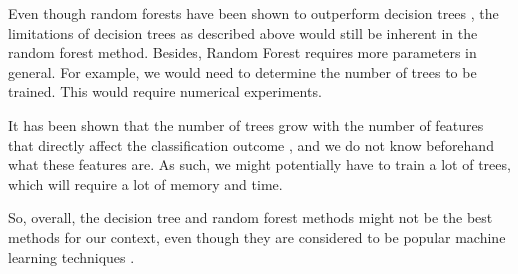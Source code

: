 \documentclass[12pt, twoside, a4paper]{report}
\begin{document}
Even though random forests have been shown to outperform decision trees \cite{RefWorks:103}, the limitations of decision trees as described above would still be inherent in the random forest method. Besides, Random Forest requires more parameters in general. For example, we would need to determine the number of trees to be trained. This would require numerical experiments.

It has been shown that the number of trees grow with the number of features that directly affect the classification outcome \cite{RefWorks:102}, and we do not know beforehand what these features are. As such, we might potentially have to train a lot of trees, which will require a lot of memory and time.

So, overall, the decision tree and random forest methods might not be the best methods for our context, even though they are considered to be popular machine learning techniques \cite{RefWorks:103}.

\end{document}
